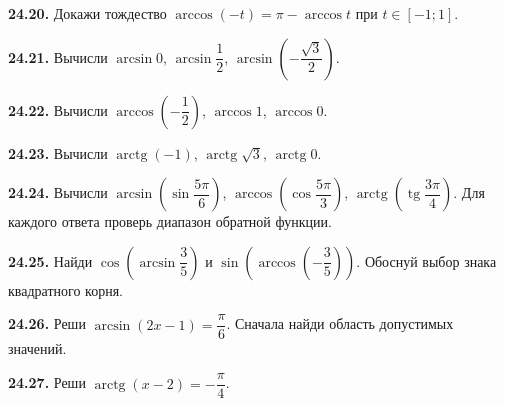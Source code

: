 \noindent\begin{minipage}[t]{\linewidth}\textbf{24.20.}\starmark{} Докажи тождество \(\arccos(-t)=\pi-\arccos t\) при \(t\in[-1;1]\).\par\end{minipage}\par
\noindent\begin{minipage}[t]{\linewidth}\textbf{24.21.} Вычисли \(\arcsin0\), \(\arcsin\dfrac12\), \(\arcsin(-\dfrac{\sqrt3}{2})\).\par\end{minipage}\par
\noindent\begin{minipage}[t]{\linewidth}\textbf{24.22.} Вычисли \(\arccos(-\dfrac12)\), \(\arccos1\), \(\arccos0\).\par\end{minipage}\par
\noindent\begin{minipage}[t]{\linewidth}\textbf{24.23.} Вычисли \(\operatorname{arctg}(-1)\), \(\operatorname{arctg}\sqrt3\), \(\operatorname{arctg}0\).\par\end{minipage}\par
\noindent\begin{minipage}[t]{\linewidth}\textbf{24.24.}\starmark{} Вычисли \(\arcsin(\sin\dfrac{5\pi}6)\), \(\arccos(\cos\dfrac{5\pi}3)\), \(\operatorname{arctg}(\operatorname{tg}\dfrac{3\pi}4)\). Для каждого ответа проверь диапазон обратной функции.\par\end{minipage}\par
\noindent\begin{minipage}[t]{\linewidth}\textbf{24.25.} Найди \(\cos(\arcsin\dfrac35)\) и \(\sin(\arccos(-\dfrac35))\). Обоснуй выбор знака квадратного корня.\par\end{minipage}\par
\noindent\begin{minipage}[t]{\linewidth}\textbf{24.26.} Реши \(\arcsin(2x-1)=\dfrac\pi6\). Сначала найди область допустимых значений.\par\end{minipage}\par
\noindent\begin{minipage}[t]{\linewidth}\textbf{24.27.} Реши \(\operatorname{arctg}(x-2)=-\dfrac\pi4\).\par\end{minipage}\par
